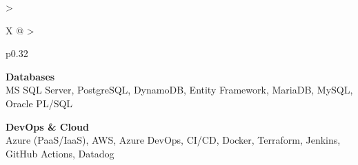 \documentclass[10pt,a4paper]{article}
\begin{document}
\begin{tabularx}{\textwidth}{
  >{\raggedright\arraybackslash}X
  @{\hspace{1cm}}
  >{\raggedright\arraybackslash}p{0.32\textwidth}
}
\begin{minipage}[t]{\linewidth}
\vspace{4pt}

\textbf{\color{primary} Databases}\\
\color{darkgray} MS SQL Server, PostgreSQL, DynamoDB, Entity Framework, MariaDB, MySQL, Oracle PL/SQL

\vspace{4pt}

\textbf{\color{primary} DevOps \& Cloud}\\
\color{darkgray} Azure (PaaS/IaaS), AWS, Azure DevOps, CI/CD, Docker, Terraform, Jenkins, GitHub Actions, Datadog

\vspace{4pt}

\end{minipage}
\\
\end{tabularx}
\end{document}

